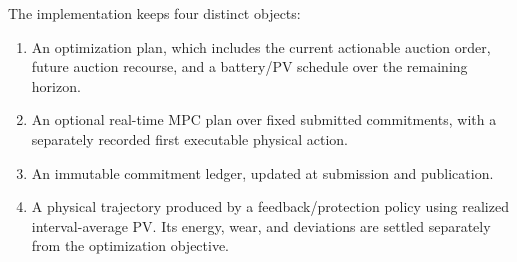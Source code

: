 \documentclass[11pt,a4paper]{article}
\begin{document}
The implementation keeps four distinct objects:
\begin{enumerate}
\item An optimization plan, which includes the current actionable auction order,
future auction recourse, and a battery/PV schedule over the remaining horizon.
\item An optional real-time MPC plan over fixed submitted commitments, with a
separately recorded first executable physical action.
\item An immutable commitment ledger, updated at submission and publication.
\item A physical trajectory produced by a feedback/protection policy using
realized interval-average PV. Its energy, wear, and deviations are settled
separately from the optimization objective.
\end{enumerate}
\end{document}
